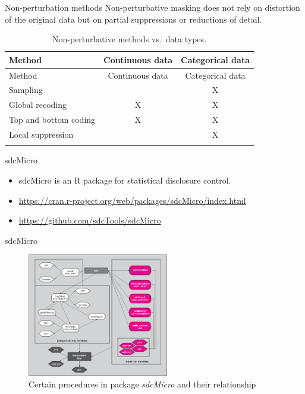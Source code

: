 \documentclass[
  ignorenonframetext,
  aspectratio=169,
]{beamer}
\begin{document}
\begin{frame}{Non-perturbation methods}
\protect\hypertarget{non-perturbation-methods}{}
Non-perturbative masking does not rely on distortion of the original
data but on partial suppressions or reductions of detail.

\begin{longtable}[]{@{}lcc@{}}
\caption{Non-perturbative methods vs.~data types.}\tabularnewline
\toprule\noalign{}
Method & Continuous data & Categorical data \\
\midrule\noalign{}
\endfirsthead
\toprule\noalign{}
Method & Continuous data & Categorical data \\
\midrule\noalign{}
\endhead
Sampling & & X \\
Global recoding & X & X \\
Top and bottom coding & X & X \\
Local suppression & & X \\
\bottomrule\noalign{}
\end{longtable}
\end{frame}

\begin{frame}{sdcMicro}
\protect\hypertarget{sdcmicro}{}
\begin{itemize}
\item
  sdcMicro is an R package for statistical disclosure control.
\item
  \url{https://cran.r-project.org/web/packages/sdcMicro/index.html}
\item
  \url{https://github.com/sdcTools/sdcMicro}
\end{itemize}
\end{frame}

\begin{frame}{sdcMicro}
\protect\hypertarget{sdcmicro-1}{}
\begin{figure}

{\centering \includegraphics[width=0.55\textwidth,height=\textheight]{gallery/sdcMicro.png}

}

\caption{Certain procedures in package \emph{sdcMicro} and their
relationship}

\end{figure}
\end{frame}
\end{document}
